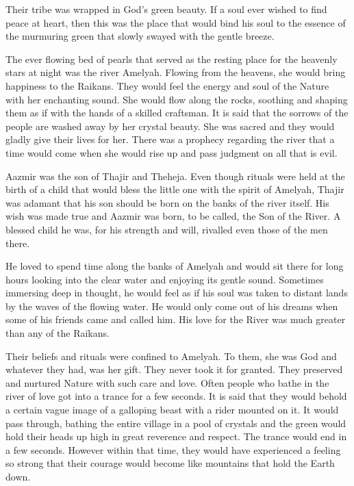 \documentclass[twoside,11pt,titlepage]{article}
\begin{document}
Their tribe was wrapped in God's green beauty. If a soul ever wished to find peace at heart, then this was the place that would bind his soul to the essence of the murmuring green that slowly swayed with the gentle breeze.

The ever flowing bed of pearls that served as the resting place for the heavenly stars at night was the river Amelyah. Flowing from the heavens, she would bring happiness to the Raikans. They would feel the energy and soul of the Nature with her enchanting sound. She would flow along the rocks, soothing and shaping them as if with the hands of a skilled craftsman. It is said that the sorrows of the people are washed away by her crystal beauty. She was sacred and they would gladly give their lives for her. There was a prophecy regarding the river that a time would come when she would rise up and pass judgment on all that is evil.

Aazmir was the son of Thajir and Theheja. Even though rituals were held at the birth of a child that would bless the little one with the spirit of Amelyah, Thajir was adamant that his son should be born on the banks of the river itself. His wish was made true and Aazmir was born, to be called, the Son of the River. A blessed child he was, for his strength and will, rivalled even those of the men there.

He loved to spend time along the banks of Amelyah and would sit there for long hours looking into the clear water and enjoying its gentle sound. Sometimes immersing deep in thought, he would feel as if his soul was taken to distant lands by the waves of the flowing water. He would only come out of his dreams when some of his friends came and called him. His love for the River was much greater than any of the Raikans.

Their beliefs and rituals were confined to Amelyah. To them, she was God and whatever they had, was her gift. They never took it for granted. They preserved and nurtured Nature with such care and love. Often people who bathe in the river of love got into a trance for a few seconds. It is said that they would behold a certain vague image of a galloping beast with a rider mounted on it. It would pass through, bathing the entire village in a pool of crystals and the green would hold their heads up high in great reverence and respect. The trance would end in a few seconds. However within that time, they would have experienced a feeling so strong that their courage would become like mountains that hold the Earth down.
\end{document}
